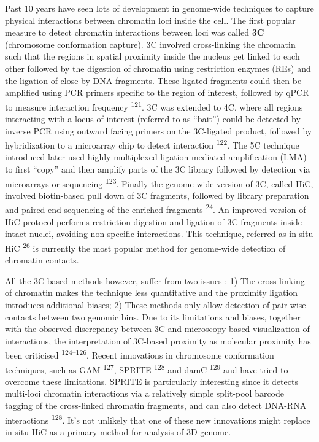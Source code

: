 \documentclass[11pt,twoside]{MPIthesis}
\theoremstyle{definition}
\theoremstyle{definition}
\theoremstyle{definition}
\theoremstyle{remark}
\begin{document}
Past 10 years have seen lots of development in genome-wide techniques to
capture physical interactions between chromatin loci inside the cell.
The first popular measure to detect chromatin interactions between loci
was called \textbf{3C} (chromosome conformation capture). 3C involved
cross-linking the chromatin such that the regions in spatial proximity
inside the nucleus get linked to each other followed by the digestion of
chromatin using restriction enzymes (REs) and the ligation of close-by
DNA fragments. These ligated fragments could then be amplified using PCR
primers specific to the region of interest, followed by qPCR to measure
interaction frequency \textsuperscript{121}. 3C was extended to 4C,
where all regions interacting with a locus of interest (referred to as
``bait'') could be detected by inverse PCR using outward facing primers
on the 3C-ligated product, followed by hybridization to a microarray
chip to detect interaction \textsuperscript{122}. The 5C technique
introduced later used highly multiplexed ligation-mediated amplification
(LMA) to first ``copy'' and then amplify parts of the 3C library
followed by detection via microarrays or sequencing
\textsuperscript{123}. Finally the genome-wide version of 3C, called
HiC, involved biotin-based pull down of 3C fragments, followed by
library preparation and paired-end sequencing of the enriched fragments
\textsuperscript{24}. An improved version of HiC protocol performs
restriction digestion and ligation of 3C fragments inside intact nuclei,
avoiding non-specific interactions. This technique, referred as in-situ
HiC \textsuperscript{26} is currently the most popular method for
genome-wide detection of chromatin contacts.

All the 3C-based methods however, suffer from two issues : 1) The
cross-linking of chromatin makes the technique less quantitative and the
proximity ligation introduces additional biases; 2) These methods only
allow detection of pair-wise contacts between two genomic bins. Due to
its limitations and biases, together with the observed discrepancy
between 3C and microscopy-based visualization of interactions, the
interpretation of 3C-based proximity as molecular proximity has been
criticised \textsuperscript{124--126}. Recent innovations in chromosome
conformation techniques, such as GAM \textsuperscript{127}, SPRITE
\textsuperscript{128} and damC \textsuperscript{129} and have tried to
overcome these limitations. SPRITE is particularly interesting since it
detects multi-loci chromatin interactions via a relatively simple
split-pool barcode tagging of the cross-linked chromatin fragments, and
can also detect DNA-RNA interactions \textsuperscript{128}. It's not
unlikely that one of these new innovations might replace in-situ HiC as
a primary method for analysis of 3D genome.
\end{document}
